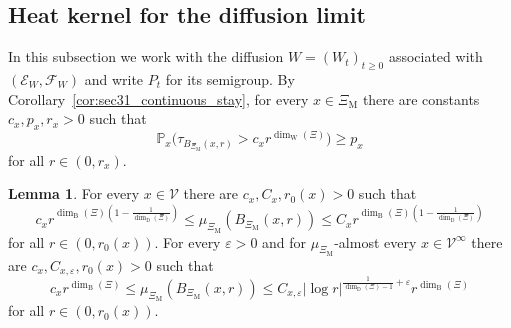 \documentclass{article}
\theoremstyle{plain}
\theoremstyle{definition}
\newtheorem{lemma}[theorem]{Lemma}
\newcommand{\dimbox}{\dim_\mathrm{B}}
\newcommand{\dimdeg}{\dim_\mathrm{D}}
\newcommand{\dimwalk}{\dim_\mathrm{W}}
\begin{document}
\subsection{Heat kernel for the diffusion limit}\label{subsec:heat_kernel_diffusion}

In this subsection we work with the diffusion $W=(W_t)_{t\ge 0}$ associated with $(\mathcal E_W,\mathcal F_W)$ and write $P_t$ for its semigroup.
By Corollary~\ref{cor:sec31_continuous_stay}, for every $x\in \Xi_{\mathrm M}$ there are constants $c_x,p_x,r_x>0$ such that
\[
\mathbb P_x\bigl(\tau_{B_{\Xi_{\mathrm M}}(x,r)}>c_xr^{\dimwalk(\Xi)}\bigr)\ge p_x
\]
for all $r\in(0,r_x)$.

\begin{lemma}\label{lem:heat-volume}
For every $x\in \mathscr V$ there are $c_x,C_x,r_0(x)>0$ such that
\[
c_x r^{\dimbox(\Xi)\left(1-\frac{1}{\dimdeg(\Xi)}\right)}
\le
\mu_{\Xi_{\mathrm M}}(B_{\Xi_{\mathrm M}}(x,r))
\le
C_x r^{\dimbox(\Xi)\left(1-\frac{1}{\dimdeg(\Xi)}\right)}
\]
for all $r\in(0,r_0(x))$.
For every $\varepsilon>0$ and for $\mu_{\Xi_{\mathrm M}}$-almost every $x\in \mathscr V^\infty$ there are $c_x,C_{x,\varepsilon},r_0(x)>0$ such that
\[
c_x r^{\dimbox(\Xi)}
\le
\mu_{\Xi_{\mathrm M}}(B_{\Xi_{\mathrm M}}(x,r))
\le
C_{x,\varepsilon} |\log r|^{\frac{1}{\dimdeg(\Xi)-1}+\varepsilon} r^{\dimbox(\Xi)}
\]
for all $r\in(0,r_0(x))$.
\end{lemma}
\end{document}
